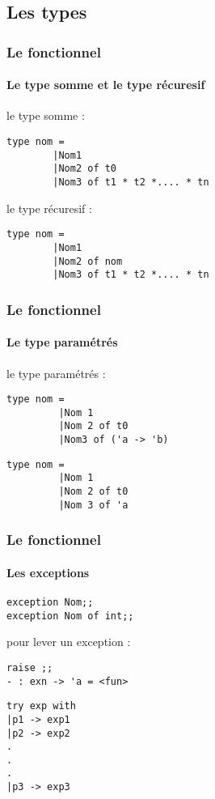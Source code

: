 \subsection{Les types} 
\begin{frame}[fragile]
	\frametitle{Le fonctionnel}
	\framesubtitle{Le type somme et le type récuresif}
	le type somme :
	\begin{lstlisting}
type nom =
        |Nom1 
        |Nom2 of t0 
        |Nom3 of t1 * t2 *.... * tn 
	\end{lstlisting}
	le type récuresif :
	\begin{lstlisting}
type nom =
        |Nom1
        |Nom2 of nom
        |Nom3 of t1 * t2 *.... * tn
         \end{lstlisting}
\end{frame}

\begin{frame}[fragile]
  \frametitle{Le fonctionnel}
  \framesubtitle{Le type paramétrés}
  le type paramétrés :
  \begin{lstlisting}
type nom =
         |Nom 1
         |Nom 2 of t0
         |Nom3 of ('a -> 'b)
  \end{lstlisting}
  \begin{lstlisting}
type nom = 
         |Nom 1 
         |Nom 2 of t0
         |Nom 3 of 'a 
  \end{lstlisting}
\end{frame}

\begin{frame}[fragile]
  \frametitle{Le fonctionnel}
  \framesubtitle{Les exceptions}
  \begin{lstlisting}
exception Nom;;
exception Nom of int;;
  \end{lstlisting}
pour lever un exception : 
\begin{lstlisting}
raise ;;
- : exn -> 'a = <fun>
\end{lstlisting}
\begin{lstlisting}
try exp with 
|p1 -> exp1
|p2 -> exp2
.
.
.
|p3 -> exp3
\end{lstlisting}
\end{frame}
